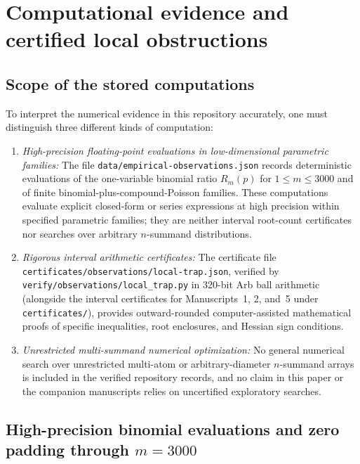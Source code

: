 \documentclass[11pt]{article}
\numberwithin{equation}{section}
\theoremstyle{definition}
\theoremstyle{remark}
\begin{document}
\section{Computational evidence and certified local obstructions}\label{sec:computations}

\subsection{Scope of the stored computations}\label{subsec:comp-scope}

To interpret the numerical evidence in this repository accurately, one must
distinguish three different kinds of computation:
\begin{enumerate}[label=(\arabic*),leftmargin=2em]
\item \emph{High-precision floating-point evaluations in low-dimensional
parametric families:} The file \texttt{data/\allowbreak empirical-observations.json}
records deterministic evaluations of the one-variable binomial ratio $R_m(p)$
for $1\le m\le3000$ and of finite binomial-plus-compound-Poisson families.
These computations evaluate explicit closed-form or series expressions at
high precision within specified parametric families; they are neither interval
root-count certificates nor searches over arbitrary $n$-summand distributions.
\item \emph{Rigorous interval arithmetic certificates:} The certificate file
\texttt{certificates/\allowbreak observations/\allowbreak local-trap.json},
verified by \texttt{verify/\allowbreak observations/\allowbreak local\_trap.py}
in 320-bit Arb ball arithmetic \citep{Johansson2017,Johansson2018} (alongside
the interval certificates for Manuscripts~1, 2, and~5 under
\texttt{certificates/}), provides outward-rounded
computer-assisted mathematical proofs of specific inequalities, root
enclosures, and Hessian sign conditions.
\item \emph{Unrestricted multi-summand numerical optimization:} No general
numerical search over unrestricted multi-atom or arbitrary-diameter
$n$-summand arrays is included in the verified repository records, and no
claim in this paper or the companion manuscripts relies on uncertified
exploratory searches.
\end{enumerate}

\subsection{High-precision binomial evaluations and zero padding through $m=3000$}\label{subsec:binomial-data}
\end{document}
